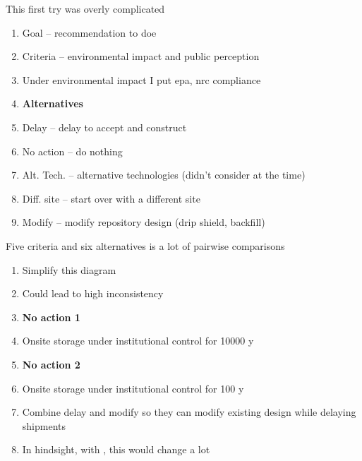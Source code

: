 \documentclass[aspectratio=1610,pdftex,dvipsnames,compress,xcolor={dvipsnames}]{beamer}
\newcommand{\acs}{\acrshort} %
\newcommand{\acsp}{\acrshortpl} %
\begin{document}
\begin{frame}{This first try was overly complicated}
    \begin{enumerate}[series=outerlist,topsep=0pt,itemsep=1pt,leftmargin=*,label=(\arabic*)]
        \item[]Goal -- recommendation to \acs{doe}
        \item[]Criteria -- environmental impact and public perception
        \item[]Under environmental impact I put \acs{epa}, \acs{nrc} compliance
            \vspace{0.15in}
        \item[]\textbf{Alternatives}
        \item[]Delay -- delay to accept and construct
        \item[]No action -- do nothing
        \item[]Alt. Tech. -- alternative technologies (didn't consider \acsp{cis} at the time)
        \item[]Diff. site -- start over with a different site  
        \item[]Modify -- modify repository design (drip shield, backfill)
    \end{enumerate}
\end{frame}


\begin{frame}{Five criteria and six alternatives is a lot of pairwise comparisons}
    \begin{enumerate}[series=outerlist,topsep=0pt,itemsep=1pt,leftmargin=*,label=(\arabic*)]
        \item[]Simplify this diagram
        \item[]Could lead to high inconsistency  
            \vspace{0.10in}
        \item[]\textbf{No action 1}
        \item[]Onsite storage under institutional control for 10000 y
            \vspace{0.10in}
        \item[]\textbf{No action 2}
        \item[]Onsite storage under institutional control for 100 y
            \vspace{0.10in}
        \item[]Combine delay and modify so they can modify existing design while delaying shipments
            \vspace{0.10in}
        \item[]In hindsight, with \acsp{cis}, this would change a lot
    \end{enumerate}
\end{frame}
\end{document}
